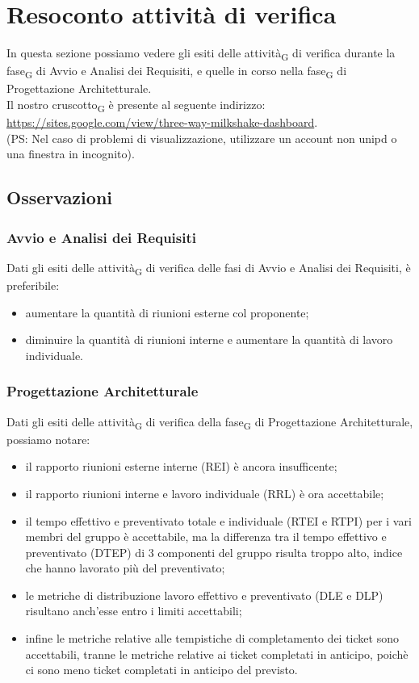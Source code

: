 
\section{Resoconto {attività} di verifica}
In questa sezione possiamo vedere gli esiti delle attività\textsubscript{G} di verifica durante la fase\textsubscript{G} di Avvio e Analisi dei Requisiti, e quelle in corso nella fase\textsubscript{G} di Progettazione Architetturale.\\
Il nostro cruscotto\textsubscript{G} è presente al seguente indirizzo:\\ \url{https://sites.google.com/view/three-way-milkshake-dashboard}.\\ (PS: Nel caso di problemi di visualizzazione, utilizzare un account non unipd o una finestra in incognito).
\subsection{Osservazioni}
\subsubsection{Avvio e Analisi dei Requisiti}
Dati gli esiti delle attività\textsubscript{G} di verifica delle fasi di Avvio e Analisi dei Requisiti, è preferibile:
\begin{itemize}
	\item aumentare la quantità di riunioni esterne col proponente;
	\item diminuire la quantità di riunioni interne e aumentare la quantità di lavoro individuale.
\end{itemize}
\subsubsection{Progettazione Architetturale}
Dati gli esiti delle attività\textsubscript{G} di verifica della fase\textsubscript{G} di Progettazione Architetturale, possiamo notare:
\begin{itemize}
	\item il rapporto riunioni esterne interne (REI) è ancora insufficente;
	\item il rapporto riunioni interne e lavoro individuale (RRL) è ora accettabile;
	\item il tempo effettivo e preventivato totale e individuale (RTEI e RTPI) per i vari membri del gruppo è accettabile, ma la differenza tra il tempo effettivo e preventivato (DTEP) di 3 componenti del gruppo risulta troppo alto, indice che hanno lavorato più del preventivato;
	\item le metriche di distribuzione lavoro effettivo e preventivato (DLE e DLP) risultano anch'esse entro i limiti accettabili;
	\item infine le metriche relative alle tempistiche di completamento dei ticket sono accettabili, tranne le metriche relative ai ticket completati in anticipo, poichè ci sono meno ticket completati in anticipo del previsto.
\end{itemize}
